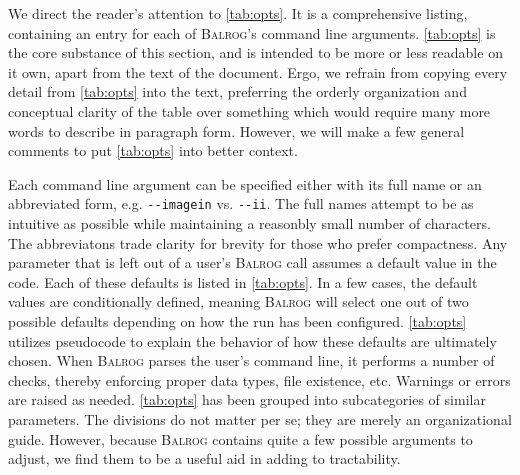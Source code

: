 \documentclass[12pt]{book}
\newcommand{\codett}[1]{\lstinline{#1}}
\newcommand{\balrog}{\textsc{Balrog}}
\newcommand{\opt}[1]{\codett{--#1}}
\begin{document}
We direct the reader's attention to \autoref{tab:opts}.
It is a comprehensive listing, containing an entry for each of \balrog{}'s command line arguments.
\autoref{tab:opts} is the core substance of this section,
and is intended to be more or less readable on it own, apart from the text of the document.
Ergo, we refrain from copying every detail from \autoref{tab:opts} into the text, 
preferring the orderly organization and conceptual clarity
of the table over something which would require many more words to describe in paragraph form.
However, we will make a few general comments to put \autoref{tab:opts} into better context.

Each command line argument can be specified either with its full name or an abbreviated form, e.g. \opt{imagein} vs. \opt{ii}.
The full names attempt to be as intuitive as possible while maintaining a reasonbly small number of characters.
The abbreviatons trade clarity for brevity for those who prefer compactness. 
Any parameter that  is left out of a user's \balrog{} call assumes a default value in the code.
Each of these defaults is listed in \autoref{tab:opts}. 
In a few cases, the default values are conditionally defined, meaning \balrog{} will select one out of
two possible defaults depending on how the run has been configured.
\autoref{tab:opts} utilizes pseudocode to explain the behavior of how these defaults are ultimately chosen.
When \balrog{} parses the user's command line, it performs a number of checks, 
thereby enforcing proper data types, file existence, etc.
Warnings or errors are raised as needed.
\autoref{tab:opts} has been grouped into subcategories of similar parameters.
The divisions do not matter per se; they are merely an organizational guide.
However, because \balrog{} contains quite a few possible arguments to adjust,
we find them to be a useful aid in adding to tractability.
\end{document}
